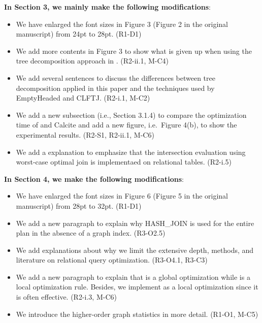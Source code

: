 \textbf{In Section 3, we mainly make the following modifications}:
\begin{itemize}
	\item We have enlarged the font sizes in Figure 3 (Figure 2 in the original manuscript) from 24pt to 28pt. (R1-D1)
	\item We add more contents in Figure 3 to show what is given up when using the tree decomposition approach in \name. (R2-ii.1, M-C4)
	\item We add several sentences to discuss the differences between tree decomposition applied in this paper and the techniques used by EmptyHeaded and CLFTJ. (R2-i.1, M-C2)
	\item We add a new subsection (i.e., Section 3.1.4) to compare the optimization time of \name and Calcite and add a new figure, i.e.~Figure 4(b), to show the experimental results. (R2-S1, R2-ii.1, M-C6)
	\item We add a explanation to emphasize that the intersection evaluation using worst-case optimal join is implementaed on relational tables. (R2-i.5)
\end{itemize}

\textbf{In Section 4, we make the following modifications}:
\begin{itemize}
	\item We have enlarged the font sizes in Figure 6 (Figure 5 in the original manuscript) from 28pt to 32pt. (R1-D1)
	\item We add a new paragraph to explain why HASH\_JOIN is used for the entire plan in the absence of a graph index. (R3-O2.5)
	\item We add explanations about why we limit the extensive depth, methods, and literature on relational query optimization. (R3-O4.1, R3-C3)
	\item We add a new paragraph to explain that \filterrule is a global optimization while \fusionrule is a local optimization rule. Besides, we implement \filterrule as a local optimization since it is often effective. (R2-i.3, M-C6)
	\item We introduce the higher-order graph statistics in more detail. (R1-O1, M-C5)
\end{itemize}

